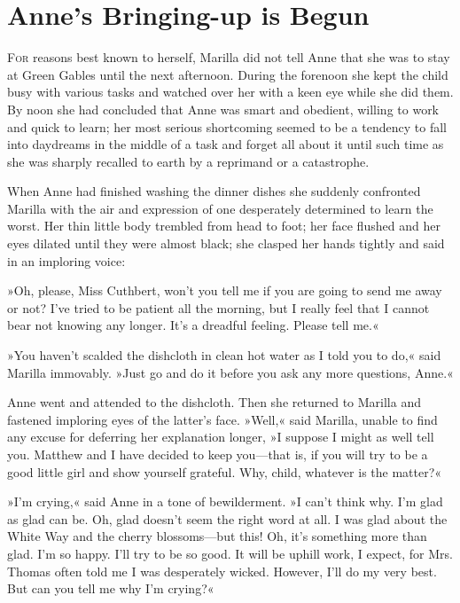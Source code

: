 \chapter{Anne's Bringing-up is Begun}

\lettrine[lines=4]{F}{or} reasons best known to herself, Marilla did not tell Anne that she was to stay at Green Gables until the next afternoon. During the forenoon she kept the child busy with various tasks and watched over her with a keen eye while she did them. By noon she had concluded that Anne was smart and obedient, willing to work and quick to learn; her most serious shortcoming seemed to be a tendency to fall into daydreams in the middle of a task and forget all about it until such time as she was sharply recalled to earth by a reprimand or a catastrophe.

When Anne had finished washing the dinner dishes she suddenly confronted Marilla with the air and expression of one desperately determined to learn the worst. Her thin little body trembled from head to foot; her face flushed and her eyes dilated until they were almost black; she clasped her hands tightly and said in an imploring voice:

»Oh, please, Miss Cuthbert, won't you tell me if you are going to send me away or not? I've tried to be patient all the morning, but I really feel that I cannot bear not knowing any longer. It's a dreadful feeling. Please tell me.«

»You haven't scalded the dishcloth in clean hot water as I told you to do,« said Marilla immovably. »Just go and do it before you ask any more questions, Anne.«

Anne went and attended to the dishcloth. Then she returned to Marilla and fastened imploring eyes of the latter's face. »Well,« said Marilla, unable to find any excuse for deferring her explanation longer, »I suppose I might as well tell you. Matthew and I have decided to keep you—that is, if you will try to be a good little girl and show yourself grateful. Why, child, whatever is the matter?«

»I'm crying,« said Anne in a tone of bewilderment. »I can't think why. I'm glad as glad can be. Oh, glad doesn't seem the right word at all. I was glad about the White Way and the cherry blossoms—but this! Oh, it's something more than glad. I'm so happy. I'll try to be so good. It will be uphill work, I expect, for Mrs. Thomas often told me I was desperately wicked. However, I'll do my very best. But can you tell me why I'm crying?«

